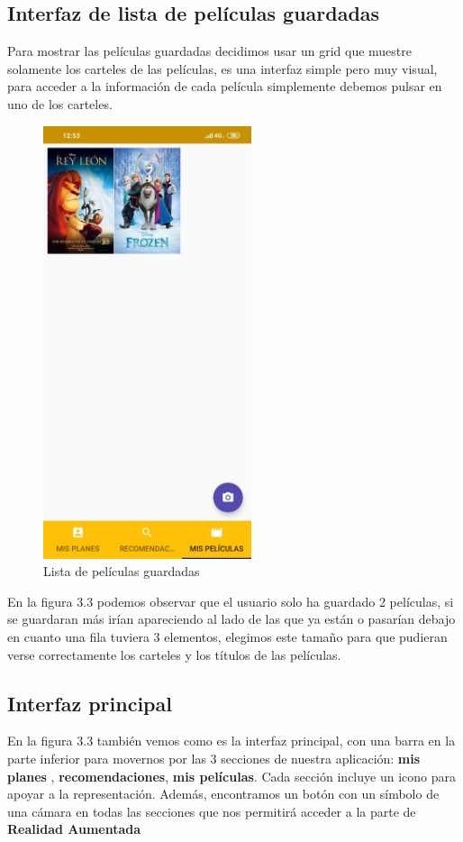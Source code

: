 \subsection{Interfaz de lista de películas guardadas}
\label{makereference3.4.2}
Para mostrar las películas guardadas decidimos usar un grid que muestre solamente los carteles de las películas, es una interfaz simple pero muy visual, para acceder a la información
de cada película simplemente debemos pulsar en uno de los carteles.
\begin{figure}[H]
    \centering
    \includegraphics[height=5in]{figures/FilmsList.jpg}
    \caption{Lista de películas guardadas}
\end{figure}
En la figura 3.3 podemos observar que el usuario solo ha guardado 2 películas, si se guardaran más irían apareciendo al lado de las que ya están o pasarían debajo en cuanto una 
fila tuviera 3 elementos, elegimos este tamaño para que pudieran verse correctamente los carteles y los títulos de las películas.
\subsection{Interfaz principal}
\label{makereference3.4.3}
En la figura 3.3 también vemos como es la interfaz principal, con una barra en la parte inferior para movernos por las 3 secciones de nuestra aplicación: \textbf{mis planes} , \textbf{recomendaciones}, \textbf{mis películas}.
Cada sección incluye un icono para apoyar a la representación.
Además, encontramos un botón con un símbolo de una cámara en todas las secciones que nos permitirá acceder a la parte de \textbf{Realidad Aumentada}

